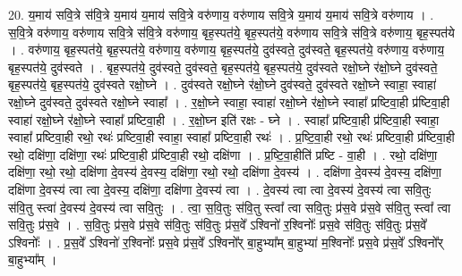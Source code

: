 \documentclass[17pt]{extarticle}
\begin{document}
20. य॒माय॑ सवि॒त्रे स॑वि॒त्रे य॒माय॑ य॒माय॑ सवि॒त्रे वरु॑णाय॒ वरु॑णाय सवि॒त्रे य॒माय॑ य॒माय॑ सवि॒त्रे वरु॑णाय । . स॒वि॒त्रे वरु॑णाय॒ वरु॑णाय सवि॒त्रे स॑वि॒त्रे वरु॑णाय॒ बृह॒स्पत॑ये॒ बृह॒स्पत॑ये॒ वरु॑णाय सवि॒त्रे स॑वि॒त्रे वरु॑णाय॒ बृह॒स्पत॑ये । . वरु॑णाय॒ बृह॒स्पत॑ये॒ बृह॒स्पत॑ये॒ वरु॑णाय॒ वरु॑णाय॒ बृह॒स्पत॑ये॒ दुव॑स्वते॒ दुव॑स्वते॒ बृह॒स्पत॑ये॒ वरु॑णाय॒ वरु॑णाय॒ बृह॒स्पत॑ये॒ दुव॑स्वते । . बृह॒स्पत॑ये॒ दुव॑स्वते॒ दुव॑स्वते॒ बृह॒स्पत॑ये॒ बृह॒स्पत॑ये॒ दुव॑स्वते रक्षो॒घ्ने र॑क्षो॒घ्ने दुव॑स्वते॒ बृह॒स्पत॑ये॒ बृह॒स्पत॑ये॒ दुव॑स्वते रक्षो॒घ्ने । . दुव॑स्वते रक्षो॒घ्ने र॑क्षो॒घ्ने दुव॑स्वते॒ दुव॑स्वते रक्षो॒घ्ने स्वाहा॒ स्वाहा॑ रक्षो॒घ्ने दुव॑स्वते॒ दुव॑स्वते रक्षो॒घ्ने स्वाहा᳚ । . र॒क्षो॒घ्ने स्वाहा॒ स्वाहा॑ रक्षो॒घ्ने र॑क्षो॒घ्ने स्वाहा᳚ प्रष्टिवा॒ही प्र॑ष्टिवा॒ही स्वाहा॑ रक्षो॒घ्ने र॑क्षो॒घ्ने स्वाहा᳚ प्रष्टिवा॒ही । . र॒क्षो॒घ्न इति॑ रक्षः - घ्ने । . स्वाहा᳚ प्रष्टिवा॒ही प्र॑ष्टिवा॒ही स्वाहा॒ स्वाहा᳚ प्रष्टिवा॒ही रथो॒ रथः॑ प्रष्टिवा॒ही स्वाहा॒ स्वाहा᳚ प्रष्टिवा॒ही रथः॑ । . प्र॒ष्टि॒वा॒ही रथो॒ रथः॑ प्रष्टिवा॒ही प्र॑ष्टिवा॒ही रथो॒ दक्षि॑णा॒ दक्षि॑णा॒ रथः॑ प्रष्टिवा॒ही प्र॑ष्टिवा॒ही रथो॒ दक्षि॑णा । . प्र॒ष्टि॒वा॒हीति॑ प्रष्टि - वा॒ही । . रथो॒ दक्षि॑णा॒ दक्षि॑णा॒ रथो॒ रथो॒ दक्षि॑णा दे॒वस्य॑ दे॒वस्य॒ दक्षि॑णा॒ रथो॒ रथो॒ दक्षि॑णा दे॒वस्य॑ । . दक्षि॑णा दे॒वस्य॑ दे॒वस्य॒ दक्षि॑णा॒ दक्षि॑णा दे॒वस्य॑ त्वा त्वा दे॒वस्य॒ दक्षि॑णा॒ दक्षि॑णा दे॒वस्य॑ त्वा । . दे॒वस्य॑ त्वा त्वा दे॒वस्य॑ दे॒वस्य॑ त्वा सवि॒तुः स॑वि॒तु स्त्वा॑ दे॒वस्य॑ दे॒वस्य॑ त्वा सवि॒तुः । . त्वा॒ स॒वि॒तुः स॑वि॒तु स्त्वा᳚ त्वा सवि॒तुः प्र॑स॒वे प्र॑स॒वे स॑वि॒तु स्त्वा᳚ त्वा सवि॒तुः प्र॑स॒वे । . स॒वि॒तुः प्र॑स॒वे प्र॑स॒वे स॑वि॒तुः स॑वि॒तुः प्र॑स॒वे᳚ ऽश्विनो॑ र॒श्विनोः᳚ प्रस॒वे स॑वि॒तुः स॑वि॒तुः प्र॑स॒वे᳚ ऽश्विनोः᳚ । . प्र॒स॒वे᳚ ऽश्विनो॑ र॒श्विनोः᳚ प्रस॒वे प्र॑स॒वे᳚ ऽश्विनो᳚र् बा॒हुभ्या᳚म् बा॒हुभ्या॑ म॒श्विनोः᳚ प्रस॒वे प्र॑स॒वे᳚ ऽश्विनो᳚र् बा॒हुभ्या᳚म् । \newline
\end{document}
